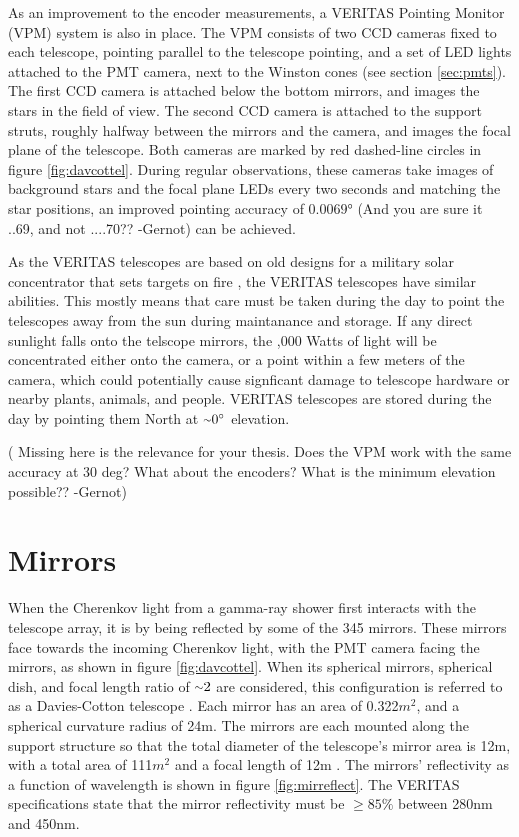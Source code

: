 As an improvement to the encoder measurements, a VERITAS Pointing Monitor (VPM) system is also in place.
The VPM consists of two CCD cameras fixed to each telescope, pointing parallel to the telescope pointing, and a set of LED lights attached to the PMT camera, next to the Winston cones (see section \ref{sec:pmts}).
The first CCD camera is attached below the bottom mirrors, and images the stars in the field of view.
The second CCD camera is attached to the support struts, roughly halfway between the mirrors and the camera, and images the focal plane of the telescope.
Both cameras are marked by red dashed-line circles in figure \ref{fig:davcottel}.
During regular observations, these cameras take images of background stars and the focal plane LEDs every two seconds and matching the star positions, an improved pointing accuracy of $ \ang{0.0069} $ {\color{red}(And you are sure it ..69, and not ....70?? -Gernot)} can be achieved.

As the VERITAS telescopes are based on old designs for a military solar concentrator that sets targets on fire \cite{daviescotton}, the VERITAS telescopes have similar abilities.
This mostly means that care must be taken during the day to point the telescopes away from the sun during maintanance and storage.
If any direct sunlight falls onto the telscope mirrors, the ,000 Watts of light will be concentrated either onto the camera, or a point within a few meters of the camera, which could potentially cause signficant damage to telescope hardware or nearby plants, animals, and people.
VERITAS telescopes are stored during the day by pointing them North at $ \nicetilde \ang{0} $ elevation.

{\color{red}( Missing here is the relevance for your thesis. Does the VPM work with the same accuracy at 30 deg? What about the encoders? What is the minimum elevation possible?? -Gernot)}

\section{Mirrors}\label{sec:mirrors}

When the Cherenkov light from a gamma-ray shower first interacts with the telescope array, it is by being reflected by some of the 345 mirrors.
These mirrors face towards the incoming Cherenkov light, with the PMT camera facing the mirrors, as shown in figure \ref{fig:davcottel}.
When its spherical mirrors, spherical dish, and focal length ratio of $ \nicetilde 2 $ are considered, this configuration is referred to as a Davies-Cotton telescope \cite{daviescotton}.
Each mirror has an area of 0.322$m^2$, and a spherical curvature radius of 24m.
The mirrors are each mounted along the support structure so that the total diameter of the telescope's mirror area is 12m, with a total area of 111$m^2$ and a focal length of 12m \cite{Veritas_Detector}.
The mirrors' reflectivity as a function of wavelength is shown in figure \ref{fig:mirreflect}.
The VERITAS specifications state that the mirror reflectivity must be $\geq 85\%$ between 280nm and 450nm.

